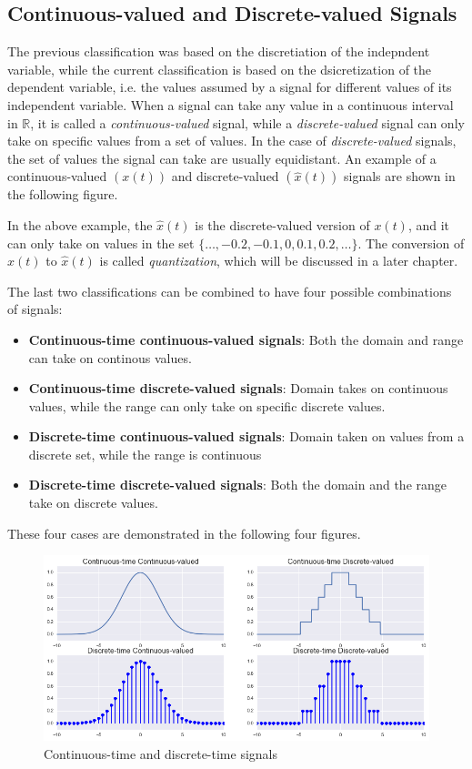 \subsection{Continuous-valued and Discrete-valued Signals}
The previous classification was based on the discretiation of the indepndent variable, while the current classification is based on the dsicretization of the dependent variable, i.e. the values assumed by a signal for different values of its independent variable. When a signal can take  any value in a continuous interval in $\mathbb{R}$, it is called a \textit{continuous-valued} signal, while a \textit{discrete-valued} signal can only take on specific values from a set of values. In the case of \textit{discrete-valued} signals, the set of values the signal can take are usually equidistant. An example of a continuous-valued $\left(x\left(t\right)\right)$ and discrete-valued $\left(\hat{x}\left(t\right)\right)$ signals are shown in the following figure.

In the above example, the $\hat{x}\left(t\right)$ is the discrete-valued version of $x\left(t\right)$, and it can only take on values in the set $\{\dotsc, -0.2, -0.1, 0, 0.1, 0.2, \dotsc\}$. The conversion of $x\left(t\right)$ to $\hat{x}\left(t\right)$ is called \textit{quantization}, which will be discussed in a later chapter.

The last two classifications can be combined to have four possible combinations of signals:
\begin{itemize}
    \item \textbf{Continuous-time continuous-valued signals}: Both the domain and range can take on continous values.
    \item \textbf{Continuous-time discrete-valued signals}: Domain takes on continuous values, while the range can only take on specific discrete values.
    \item \textbf{Discrete-time continuous-valued signals}: Domain taken on values from a discrete set, while the range is continuous
    \item \textbf{Discrete-time discrete-valued signals}: Both the domain and the range take on discrete values.
\end{itemize}

These four cases are demonstrated in the following four figures.

\begin{figure}[h]
\centering
    \includegraphics[width=\textwidth]{figs/full-classify.png}
\caption{Continuous-time and discrete-time signals} \label{fig:ch2_full}
\end{figure}

